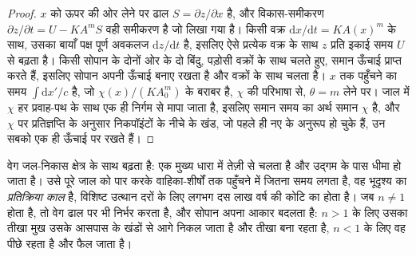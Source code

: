 \begin{proof}
$x$ को ऊपर की ओर लेने पर ढाल $S = \partial z/\partial x$ है, और
विकास-समीकरण $\partial z/\partial t = U - K A^m S$ वही समीकरण है
जो लिखा गया है। किसी वक्र $\mathrm{d}x/\mathrm{d}t = K A(x)^m$ के साथ, उसका बायाँ पक्ष
पूर्ण अवकलज $\mathrm{d}z/\mathrm{d}t$ है, इसलिए ऐसे प्रत्येक वक्र के साथ $z$ प्रति
इकाई समय $U$ से बढ़ता है। किसी सोपान के दोनों ओर के दो बिंदु,
पड़ोसी वक्रों के साथ चलते हुए, समान ऊँचाई प्राप्त करते हैं, इसलिए सोपान
अपनी ऊँचाई बनाए रखता है और वक्रों के साथ चलता है। $x$ तक पहुँचने का समय
$\int \mathrm{d}x'/c$ है, जो $\chi(x)/(K A_0^m)$ के बराबर है,
$\chi$ की परिभाषा से, $\theta = m$ लेने पर। जाल में $\chi$ हर
प्रवाह-पथ के साथ एक ही निर्गम से मापा जाता है, इसलिए समान समय का अर्थ समान $\chi$ है, और
$\chi$ पर प्रतिज्ञप्ति के अनुसार निकपॉइंटों के नीचे के खंड, जो पहले ही
नए  के अनुरूप हो चुके हैं, उन सबको एक ही ऊँचाई पर रखते हैं।
\end{proof}

वेग जल-निकास क्षेत्र के साथ बढ़ता है: एक  मुख्य धारा में तेज़ी से चलता है
और उद्गम के पास धीमा हो जाता है। उसे पूरे जाल को पार करके
वाहिका-शीर्षों तक पहुँचने में जितना समय लगता है, वह भूदृश्य का \emph{प्रतिक्रिया काल} है,
विशिष्ट उत्थान दरों के लिए लगभग दस लाख वर्ष की कोटि का होता है। जब $n \ne 1$
होता है, तो वेग ढाल पर भी निर्भर करता है, और सोपान अपना आकार बदलता है: $n >
1$ के लिए उसका तीखा मुख उसके आसपास के खंडों से आगे निकल जाता है और तीखा बना रहता है, $n <
1$ के लिए वह पीछे रहता है और फैल जाता है।

